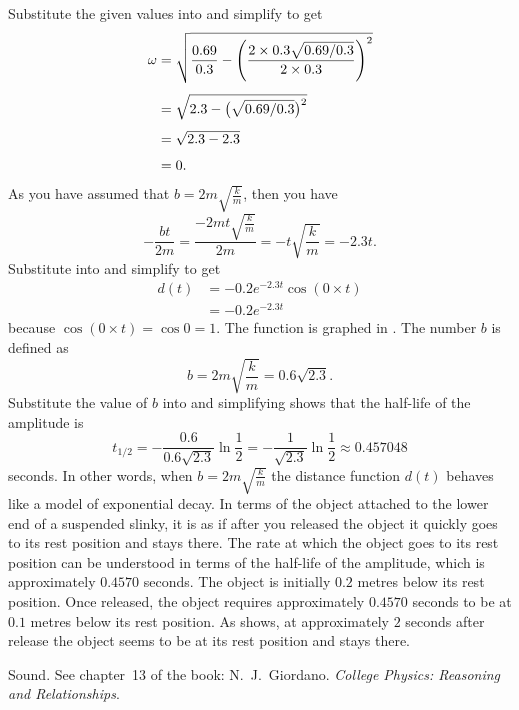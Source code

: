 \documentclass[a4paper,oneside,12pt]{article}
\begin{document}
\begin{problem}
{\begin{solution}
Substitute the given values into
 and simplify to get
\begin{align*}
\omega
&=
\sqrt{
  \frac{0.69}{0.3}
  -
  \parenthesis*{
    \frac{
      2 \times 0.3 \sqrt{0.69 / 0.3}
    }{
      2 \times 0.3
    }
  }^2
} \\[4pt]
&=
\sqrt{
  2.3
  -
  \bigparen{\sqrt{0.69 / 0.3}}^2
} \\[4pt]
&=
\sqrt{
  2.3
  -
  2.3
} \\[4pt]
&=
0.
\end{align*}
As you have assumed that $b = 2m \sqrt{\frac{k}{m}}$, then you have
\[
-\frac{bt}{2m}
=
\frac{
  -2mt \sqrt{\frac{k}{m}}
}{
  2m
}
=
-t \sqrt{\frac{k}{m}}
=
-2.3 t.
\]
Substitute into  and simplify
to get
\begin{equation}
\label{eqn:trigonometric:damped_critically_damped}
\begin{aligned}
d(t)
&=
-0.2 e^{-2.3 t} \cos(0 \times t) \\[4pt]
&=
-0.2 e^{-2.3 t}
\end{aligned}
\end{equation}
because $\cos(0 \times t) = \cos 0 = 1$.  The function is graphed in
.  The number $b$ is
defined as
\[
b
=
2m \sqrt{\frac{k}{m}}
=
0.6 \sqrt{2.3}.
\]
Substitute the value of $b$ into
 and simplifying
shows that the half-life of the amplitude is
\[
t_{1/2}
=
-\frac{0.6}{0.6 \sqrt{2.3}} \ln\frac{1}{2}
=
-\frac{1}{\sqrt{2.3}} \ln\frac{1}{2}
\approx
0.457048
\]
seconds.  In other words, when $b = 2m\sqrt{\frac{k}{m}}$ the distance
function $d(t)$ behaves like a model of exponential decay.  In terms
of the object attached to the lower end of a suspended slinky, it is
as if after you released the object it quickly goes to its rest
position and stays there.  The rate at which the object goes to its
rest position can be understood in terms of the half-life of the
amplitude, which is approximately $0.4570$ seconds.  The object is
initially $0.2$ metres below its rest position.  Once released, the
object requires approximately $0.4570$ seconds to be at $0.1$ metres
below its rest position.  As
 shows, at approximately
$2$ seconds after release the object seems to be at its rest position
and stays there.
\end{solution}
}{}

\item Sound.  See chapter~13 of the book:  N.~J.~Giordano.
  \emph{College Physics: Reasoning and Relationships}.
\end{problem}
\end{document}
